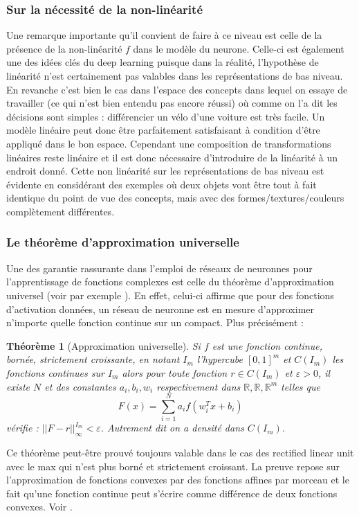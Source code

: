 \documentclass[conference]{IEEEtran}
\newtheorem{theorem}{Théorème}
\begin{document}
\subsubsection{Sur la nécessité de la non-linéarité}
Une remarque importante qu'il convient de faire à ce niveau est celle de la présence de la non-linéarité $f$ dans le modèle du neurone. Celle-ci est également une des idées clés du deep learning puisque dans la réalité, l'hypothèse de linéarité n'est certainement pas valables dans les représentations de bas niveau. En revanche c'est bien le cas dans l'espace des concepts dans lequel on essaye de travailler (ce qui n'est bien entendu pas encore réussi) où comme on l'a dit les décisions sont simples : différencier un vélo d'une voiture est très facile. Un modèle linéaire peut donc être parfaitement satisfaisant à condition d'être appliqué dans le bon espace. Cependant une composition de transformations linéaires reste linéaire et il est donc nécessaire d'introduire de la linéarité à un endroit donné. Cette non linéarité sur les représentations de bas niveau est évidente en considérant des exemples où deux objets vont être tout à fait identique du point de vue des concepts, mais avec des formes/textures/couleurs complètement différentes.

\subsubsection{Le théorème d'approximation universelle}
Une des garantie rassurante dans l'emploi de réseaux de neuronnes pour l'apprentissage de fonctions complexes est celle du théorème d'approximation universel (voir par exemple \cite{Hassoun:1995:FAN:526717}). En effet, celui-ci affirme que pour des fonctions d'activation données, un réseau de neuronne est en mesure d'approximer n'importe quelle fonction continue sur un compact. Plus précisément :

\begin{theorem}[Approximation universelle]
Si $f$ est une fonction continue, bornée, strictement croissante, en notant $I_m$ l'hypercube $[0,1]^m$ et $C(I_m)$ les fonctions continues sur $I_m$ alors pour toute fonction $r\in C(I_m)$ et $\varepsilon>0$, il existe $N$ et des constantes $a_i,b_i,w_i$ respectivement dans $\mathbb{R},\mathbb{R},\mathbb{R}^m$ telles que 
$$F(x)=\sum_{i=1}^N a_i f(w_i^T x+b_i)$$
vérifie : $||F-r||_\infty^{I_m}<\varepsilon$. Autrement dit on a densité dans $C(I_m)$.
\end{theorem}

Ce théorème peut-être prouvé toujours valable dans le cas des rectified linear unit avec le max qui n'est plus borné et strictement croissant. La preuve repose sur l'approximation de fonctions convexes par des fonctions affines par morceau et le fait qu'une fonction continue peut s'écrire comme différence de deux fonctions convexes. Voir \cite{2013arXiv1302.4389G}.
\end{document}
